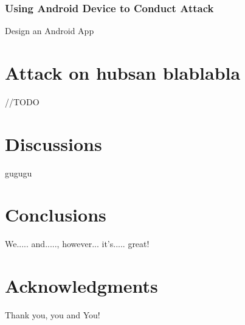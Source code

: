 \documentclass{acm_proc_article-sp}
\begin{document}
\subsubsection{Using Android Device to Conduct Attack}

Design an Android App



\section{Attack on hubsan blablabla}

//TODO

\section{Discussions}

gugugu


\section{Conclusions}

We..... and....., however... it's..... great!


\section{Acknowledgments}

Thank you, you and You!

%

%
%

\balancecolumns
\end{document}
